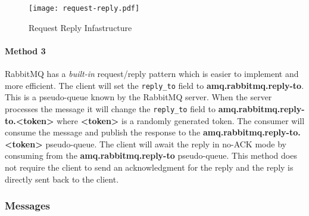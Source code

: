 \documentclass[../documentation.tex]{subfiles}
\begin{document}
\begin{figure}[h]
    \centering
    \texttt{[image: request-reply.pdf]}
    \caption{Request Reply Infastructure}
\end{figure}

\paragraph{Method 3} RabbitMQ has a \textit{built-in} request/reply pattern which is easier to implement and more efficient.
The client will set the \texttt{reply\_to} field to \textbf{amq.rabbitmq.reply-to}.
This is a pseudo-queue known by the RabbitMQ server. When the server processes the message it will change
the \texttt{reply\_to} field to \textbf{amq.rabbitmq.reply-to.<token>} where \textbf{<token>} is a randomly generated
token. The consumer will consume the message and publish the response to the \textbf{amq.rabbitmq.reply-to.<token>}
pseudo-queue. The client will await the reply in no-ACK mode by consuming from the \textbf{amq.rabbitmq.reply-to} pseudo-queue.
This method does not require the client to send an acknowledgment for the reply and the reply is directly sent back to the client.

\pagebreak

\subsubsection{Messages}

\newcommand{\tline}{
    \\ \hline
}

\newcommand{\packetstruct}[1]{
    \bgroup{}
    \def\arraystretch{1.25}
        \begin{tabular}{|l|l|l|}
            \hline
            \textbf{Field} & \textbf{Type} & \textbf{Description}
            \tline
            
            \if\relax\detokenize{#1}\relax
            \else
                #1
                \tline
            \fi
        \end{tabular}
    \egroup{}
}

\newcommand{\packetenum}[1]{
    \bgroup{}
    \def\arraystretch{1.25}
        \begin{tabular}{|l|l|l|}
            \hline
            \textbf{Field} & \textbf{Content} & \textbf{Description}
            \tline
            
            \if\relax\detokenize{#1}\relax
            \else
                #1
                \tline
            \fi
        \end{tabular}
    \egroup{}
}
\end{document}
